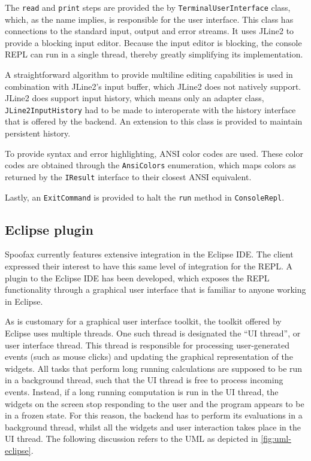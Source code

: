 The \texttt{read} and \texttt{print} steps are provided
the by \texttt{TerminalUserInterface} class, which, as the name implies, is
responsible for the user interface. This class has connections to the standard
input, output and error streams. It uses JLine2 to provide a blocking input
editor. Because the input editor is blocking, the console REPL can run in a
single thread, thereby greatly simplifying its implementation.

A straightforward algorithm to provide multiline editing capabilities is used in
combination with JLine2's input buffer, which JLine2 does not natively support.
JLine2 does support input history, which means only an adapter class,
\texttt{JLine2InputHistory} had to be made to interoperate with the history
interface that is offered by the backend. An extension to this class is provided
to maintain persistent history.

To provide syntax and error highlighting, ANSI color codes are used. These
color codes are obtained through the \texttt{AnsiColors} enumeration, which
maps colors as returned by the \texttt{IResult} interface to their closest
ANSI equivalent.

Lastly, an \texttt{ExitCommand} is provided to halt the \texttt{run} method
in \texttt{ConsoleRepl}.

\subsection{Eclipse plugin}
\label{ssec:eclipse-plugin}

Spoofax currently features extensive integration in the Eclipse IDE. The client
expressed their interest to have this same level of integration for the REPL. A
plugin to the Eclipse IDE has been developed, which exposes the REPL
functionality through a graphical user interface that is familiar to anyone
working in Eclipse.

As is customary for a graphical user interface toolkit, the toolkit offered by
Eclipse uses multiple threads. One such thread is designated the ``UI thread'',
or user interface thread. This thread is responsible for processing
user-generated events (such as mouse clicks) and updating the graphical
representation of the widgets. All tasks that perform long running
calculations are supposed to be run in a background thread, such that the UI
thread is free to process incoming events. Instead, if a long running
computation is run in the UI thread, the widgets on the screen stop responding
to the user and the program appears to be in a frozen state. For this reason,
the backend has to perform its evaluations in a background thread, whilst all
the widgets and user interaction takes place in the UI thread.
The following discussion refers to the UML as depicted in
\cref{fig:uml-eclipse}.


